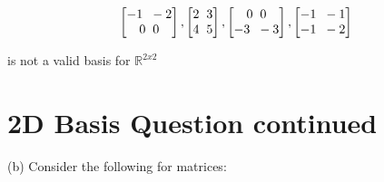 \documentclass[11pt]{article}
\begin{document}
\begin{center}
\[ 
\begin{bmatrix}
   -1  \hspace{2mm}    -2  \\
    0   \hspace{2mm}  0 
            
\end{bmatrix}
,
\begin{bmatrix}
   2  \hspace{2mm}    3  \\
    4   \hspace{2mm}  5 
            
\end{bmatrix}
,
\begin{bmatrix}
   0 \hspace{2mm}    0  \\
    -3   \hspace{2mm}  -3 
            
\end{bmatrix}
, 
\begin{bmatrix}
   -1  \hspace{2mm}    -1  \\
    -1   \hspace{2mm}  -2
            
\end{bmatrix}
\]
\end{center}

\vspace{1.5mm}

is not a valid basis for $\mathbb{R}^{2x2}$

\newpage

\section*{2D Basis Question continued}

(b) Consider the following for matrices:
\end{document}

